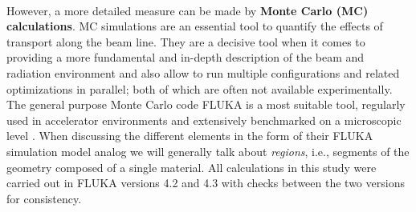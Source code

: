  \\
 However, a more detailed measure can be made by \textbf{Monte Carlo (MC) calculations}. MC simulations are an essential tool to quantify the effects of transport along the beam line. They are a decisive tool when it comes to providing a more fundamental and in-depth description of the beam and radiation environment and also allow to run multiple configurations and related optimizations in parallel; both of which are often not available experimentally. The general purpose Monte Carlo code FLUKA \cite{Battistoni15, FlukaWeb} is a most suitable tool, regularly used in accelerator environments and extensively benchmarked on a microscopic level \cite{Ahdida22, Braun14, Battistoni07}. When discussing the different elements in the form of their FLUKA simulation model analog we will generally talk about \emph{regions}, i.e., segments of the geometry composed of a single material. All calculations in this study were carried out in FLUKA versions 4.2 and 4.3 with checks between the two versions for consistency.
 
